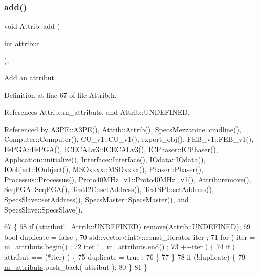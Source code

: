 \subsubsection{\texorpdfstring{add()}{add()}}
{\footnotesize\ttfamily void Attrib\+::add (\begin{DoxyParamCaption}\item[{int}]{attribut }\end{DoxyParamCaption})\hspace{0.3cm}{\ttfamily [inline]}, {\ttfamily [inherited]}}

Add an attribut 

Definition at line 67 of file Attrib.\+h.



References Attrib\+::m\+\_\+attributs, and Attrib\+::\+U\+N\+D\+E\+F\+I\+N\+ED.



Referenced by A3\+P\+E\+::\+A3\+P\+E(), Attrib\+::\+Attrib(), Specs\+Mezzanine\+::cmdline(), Computer\+::\+Computer(), C\+U\+\_\+v1\+::\+C\+U\+\_\+v1(), export\+\_\+obj(), F\+E\+B\+\_\+v1\+::\+F\+E\+B\+\_\+v1(), Fe\+P\+G\+A\+::\+Fe\+P\+G\+A(), I\+C\+E\+C\+A\+Lv3\+::\+I\+C\+E\+C\+A\+Lv3(), I\+C\+Phaser\+::\+I\+C\+Phaser(), Application\+::initialize(), Interface\+::\+Interface(), I\+Odata\+::\+I\+Odata(), I\+Oobject\+::\+I\+Oobject(), M\+S\+Oxxxx\+::\+M\+S\+Oxxxx(), Phaser\+::\+Phaser(), Processus\+::\+Processus(), Proto40\+M\+Hz\+\_\+v1\+::\+Proto40\+M\+Hz\+\_\+v1(), Attrib\+::remove(), Seq\+P\+G\+A\+::\+Seq\+P\+G\+A(), Test\+I2\+C\+::set\+Address(), Test\+S\+P\+I\+::set\+Address(), Specs\+Slave\+::set\+Address(), Specs\+Master\+::\+Specs\+Master(), and Specs\+Slave\+::\+Specs\+Slave().


\begin{DoxyCode}
67                             \{
68     \textcolor{keywordflow}{if} (attribut!=\hyperlink{classAttrib_a69e171d7cc6417835a5a306d3c764235a3a8da2ab97dda18aebab196fe4100531}{Attrib::UNDEFINED}) \textcolor{keyword}{remove}(\hyperlink{classAttrib_a69e171d7cc6417835a5a306d3c764235a3a8da2ab97dda18aebab196fe4100531}{Attrib::UNDEFINED});
69     \textcolor{keywordtype}{bool} duplicate = false ;
70     std::vector<int>::const\_iterator iter ;
71     \textcolor{keywordflow}{for} ( iter  = \hyperlink{classAttrib_ac4bd58a0cc6b38a3b711d609a3d3aacc}{m\_attributs}.begin() ;
72           iter != \hyperlink{classAttrib_ac4bd58a0cc6b38a3b711d609a3d3aacc}{m\_attributs}.end()   ;
73           ++iter ) \{
74       \textcolor{keywordflow}{if} ( attribut == (*iter) ) \{
75         duplicate = true ;
76       \}
77     \}
78     \textcolor{keywordflow}{if} (!duplicate) \{
79       \hyperlink{classAttrib_ac4bd58a0cc6b38a3b711d609a3d3aacc}{m\_attributs}.push\_back( attribut );
80     \}
81   \}
\end{DoxyCode}
\mbox{\label{classHierarchy_ad677774ff38fcb257c04a3a10d471fac}} 
